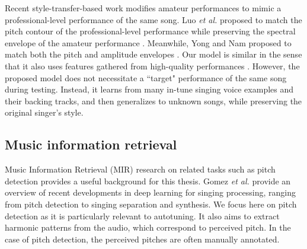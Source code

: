 Recent style-transfer-based work modifies amateur performances to mimic a professional-level performance of the same song. Luo \textit{et al.} proposed to match the pitch contour of the professional-level performance while preserving the spectral envelope of the amateur performance \cite{luo2018singing}. Meanwhile, Yong and Nam proposed to match both the pitch and amplitude envelopes \cite{yong2018singing}. Our model is similar in the sense that it also uses features gathered from high-quality performances \cite{wager2018intonation}. However, the proposed model does not necessitate a ``target" performance of the same song during testing. Instead, it learns from many in-tune singing voice examples and their backing tracks, and then generalizes to unknown songs, while preserving the original singer's style.

\subsection{Music information retrieval}
Music Information Retrieval (MIR) research on related tasks such as pitch detection provides a useful background for this thesis. Gomez {\it et al.}\cite{gomez2018deep} provide an overview of recent developments in deep learning for singing processing, ranging from pitch detection to singing separation and synthesis. We focus here on pitch detection as it is particularly relevant to autotuning. It also aims to extract harmonic patterns from the audio, which correspond to perceived pitch. In the case of pitch detection, the perceived pitches are often manually annotated. 

